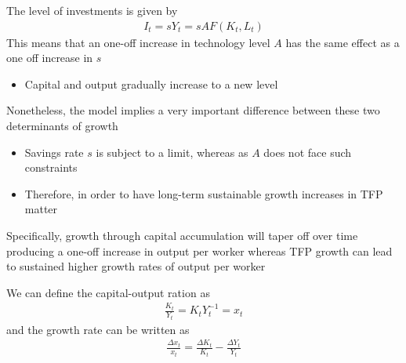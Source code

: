 \documentclass{beamer}
\begin{document}
\begin{frame}
  The level of investments is given by
\begin{align}
  I_t=sY_t=sAF(K_t,L_t)
\end{align}
 This means that an one-off increase in technology level $A$ has the same effect as a one off increase in $s$
 \begin{itemize}
   \item Capital and output gradually increase to a new level
 \end{itemize}
\end{frame}

\begin{frame}
  Nonetheless, the model implies a very important difference between these two determinants of growth
  \begin{itemize}
    \item Savings rate $s$ is subject to a limit, whereas as $A$ does not face such constraints
    \item Therefore, in order to have long-term sustainable growth increases in TFP matter
  \end{itemize}
  \medskip
  Specifically, growth through capital accumulation will taper off over time producing a one-off increase in output per worker whereas TFP growth can lead to sustained higher growth rates of output per worker
\end{frame}

\begin{frame}
  We can define the capital-output ration as
\begin{align}
  \frac{K_t}{Y_t}=K_tY_t^{-1}=x_t
\end{align}
and the growth rate can be written as
\begin{align}
  \frac{\Delta x_t}{x_t} = \frac{\Delta K_t}{K_t} - \frac{\Delta Y_t}{Y_t}
\end{align}
\end{frame}
\end{document}
